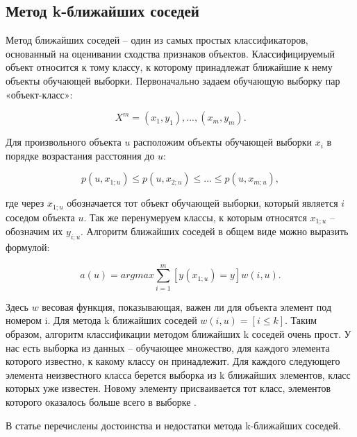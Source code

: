 \subsection{Метод k-ближайших соседей}

Метод ближайших соседей -- один из самых простых классификаторов,
основанный на оценивании сходства признаков объектов. Классифицируемый
объект относится к тому классу, к которому принадлежат ближайшие к нему
объекты обучающей выборки. Первоначально задаем обучающую выборку пар «объект-класс»: 

\begin{equation}
	X^m = {(x_{1}, y_{1}), ..., (x_{m}, y_{m})}.
\end{equation}


Для произвольного объекта $u$ расположим объекты обучающей выборки
$x_{i}$ в порядке возрастания расстояния до $u$:

\begin{equation}
	p(u,x_{1;u}) \leq p(u,x_{2;u}) \leq ... \leq p(u,x_{m;u}),
\end{equation}

где через $x_{1;u}$ обозначается тот объект обучающей выборки, который
является $i$ соседом объекта $u$. Так же перенумеруем классы, к которым
относятся  $x_{1;u}$ -- обозначим их  $y_{i;u}$. Алгоритм ближайших соседей в общем виде можно выразить формулой:

\begin{equation}
	a(u) = arg max \sum\limits_{i=1}^{m}[y(x_{1;u}) = y]w(i,u).
\end{equation}

Здесь $w$ весовая функция, показывающая, важен ли для объекта элемент
под номером i. Для метода k ближайших соседей $w(i,u) = [i \leq k]$. Таким
образом, алгоритм классификации методом ближайших k соседей очень
прост. У нас есть выборка из данных -- обучающее множество, для каждого
элемента которого известно, к какому классу он принадлежит.
Для каждого следующего элемента неизвестного класса берется выборка
из k ближайших элементов, класс которых уже известен. Новому элементу
присваивается тот класс, элементов которого оказалось больше всего в
выборке \cite{ksosed}.

В статье \cite{baes2} перечислены достоинства и недостатки метода k-ближайших соседей.


